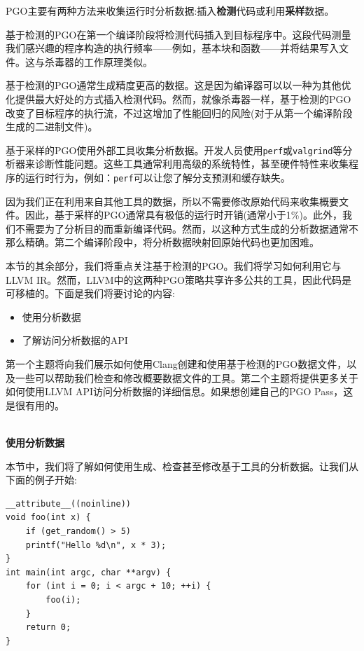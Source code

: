 PGO主要有两种方法来收集运行时分析数据:插入\textbf{检测}代码或利用\textbf{采样}数据。



基于检测的PGO在第一个编译阶段将检测代码插入到目标程序中。这段代码测量我们感兴趣的程序构造的执行频率——例如，基本块和函数——并将结果写入文件。这与杀毒器的工作原理类似。

基于检测的PGO通常生成精度更高的数据。这是因为编译器可以以一种为其他优化提供最大好处的方式插入检测代码。然而，就像杀毒器一样，基于检测的PGO改变了目标程序的执行流，不过这增加了性能回归的风险(对于从第一个编译阶段生成的二进制文件)。


基于采样的PGO使用外部工具收集分析数据。开发人员使用\texttt{perf}或\texttt{valgrind}等分析器来诊断性能问题。这些工具通常利用高级的系统特性，甚至硬件特性来收集程序的运行时行为，例如：\texttt{perf}可以让您了解分支预测和缓存缺失。

因为我们正在利用来自其他工具的数据，所以不需要修改原始代码来收集概要文件。因此，基于采样的PGO通常具有极低的运行时开销(通常小于1\%)。此外，我们不需要为了分析目的而重新编译代码。然而，以这种方式生成的分析数据通常不那么精确。第二个编译阶段中，将分析数据映射回原始代码也更加困难。

本节的其余部分，我们将重点关注基于检测的PGO。我们将学习如何利用它与LLVM IR。然而，LLVM中的这两种PGO策略共享许多公共的工具，因此代码是可移植的。下面是我们将要讨论的内容:

\begin{itemize}
\item 使用分析数据
\item 了解访问分析数据的API
\end{itemize}

第一个主题将向我们展示如何使用Clang创建和使用基于检测的PGO数据文件，以及一些可以帮助我们检查和修改概要数据文件的工具。第二个主题将提供更多关于如何使用LLVM API访问分析数据的详细信息。如果想创建自己的PGO Pass，这是很有用的。

\hspace*{\fill} \\ %
\noindent
\textbf{使用分析数据}

本节中，我们将了解如何使用生成、检查甚至修改基于工具的分析数据。让我们从下面的例子开始:

\begin{lstlisting}[style=styleCXX]
__attribute__((noinline))
void foo(int x) {
	if (get_random() > 5)
	printf("Hello %d\n", x * 3);
}
int main(int argc, char **argv) {
	for (int i = 0; i < argc + 10; ++i) {
		foo(i);
	}
	return 0;
}
\end{lstlisting}

